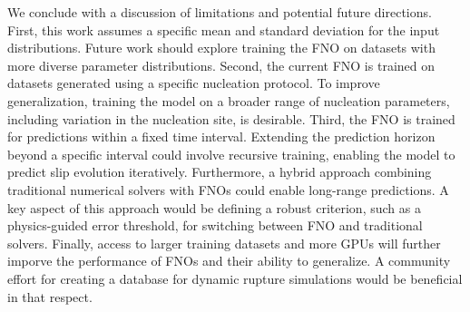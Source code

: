 \documentclass[draft]{agujournal2019}
\begin{document}
We conclude with a discussion of limitations and potential future directions. First, this work assumes a specific mean and standard deviation for the input distributions. Future work should explore training the FNO on datasets with more diverse parameter distributions. Second, the current FNO is trained on datasets generated using a specific nucleation protocol. To improve generalization, training the model on a broader range of nucleation parameters, including variation in the nucleation site, is desirable. Third, the FNO is trained for predictions within a fixed time interval. Extending the prediction horizon beyond a specific interval could involve recursive training, enabling the model to predict slip evolution iteratively. Furthermore, a hybrid approach combining traditional numerical solvers with FNOs could enable long-range predictions. A key aspect of this approach would be defining a robust criterion, such as a physics-guided error threshold, for switching between FNO and traditional solvers. Finally, access to larger training datasets and more GPUs will further imporve the performance of FNOs and their ability to generalize. A community effort for creating a database for dynamic rupture simulations would be beneficial in that respect. 





%
%
\end{document}
